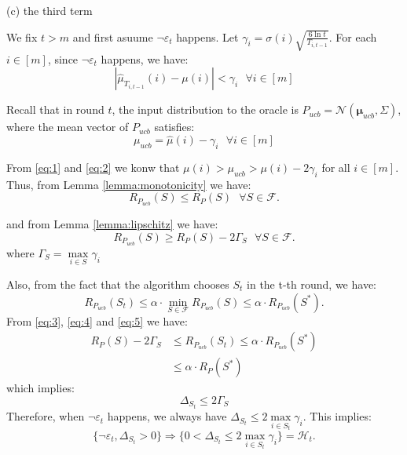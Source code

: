 \documentclass[opre,sglanonrev]{informs4}
\begin{document}
(c) the third term 

We fix $t>m$ and first asuume $\lnot \varepsilon_t$ happens. Let $\gamma_i = \sigma(i)\sqrt{\frac{6\ln t}{T_{i,t-1}}}$. For each $i \in [m]$, since $\lnot \varepsilon_t$ happens, we have:
\begin{equation} 
    \label{eq:1}
	|\hat{\mu}_{T_{i,t-1}}(i)-\mu(i)| < \gamma_i ~~~ \forall i \in [m]
\end{equation}

Recall that in round $t$, the input distribution to the oracle is $P_{ucb} = \mathcal{N}(\boldsymbol{\mu}_{ucb},\Sigma)$, where the mean vector of $P_{ucb}$ satisfies:
\begin{equation}
    \label{eq:2}
	\mu_{ucb} = \hat{\mu}(i)-\gamma_i ~~~ \forall i \in [m]
\end{equation}

From \ref{eq:1} and \ref{eq:2} we  konw that $\mu(i)>\mu_{ucb}>\mu(i)-2\gamma_i$ for all $i \in [m]$. Thus, from Lemma \ref{lemma:monotonicity} we have:
\begin{equation}
    \label{eq:3}
	R_{P_{ucb}}(S)\leq R_P(S) ~~~ \forall S \in \mathcal{F}.
\end{equation}

and from Lemma \ref{lemma:lipschitz} we have:
\begin{equation}
    \label{eq:4}
	R_{P_{ucb}}(S)\geq R_P(S)-2\Gamma_S ~~~ \forall S \in \mathcal{F}.
\end{equation}
where $\Gamma_S = \mathop{\max}\limits_{i\in S}\gamma_i$

Also, from the fact that the algorithm chooses $S_t$ in the t-th round, we have:
\begin{equation}
    \label{eq:5}
	R_{P_{ucb}}(S_t)\leq \alpha \cdot \mathop{\min}\limits_{S \in \mathcal{F}}R_{P_{ucb}}(S) \leq \alpha \cdot R_{P_{ucb}}(S^*).
\end{equation}
From \ref{eq:3}, \ref{eq:4} and \ref{eq:5} we have:
\begin{equation*}
    \begin{aligned}
	R_P(S)-2\Gamma_S &\leq R_{P_{ucb}}(S_t) \leq \alpha \cdot R_{P_{ucb}}(S^*)\\
    &\leq \alpha \cdot R_P(S^*)
    \end{aligned}
\end{equation*}
which implies:
$$
	\Delta_{S_t} \leq 2\Gamma_S
$$
Therefore, when $\lnot \varepsilon_t$ happens, we always have $\Delta_{S_t}\leq 2\mathop{\max}\limits_{i\in S_t}\gamma_i$.
This implies:
$$
	\{\lnot \varepsilon_t, \Delta_{S_t}>0\}\Longrightarrow \{0<\Delta_{S_t}\leq 2\mathop{\max}\limits_{i\in S_t}\gamma_i\}=\mathcal{H}_t.
$$
\end{document}
